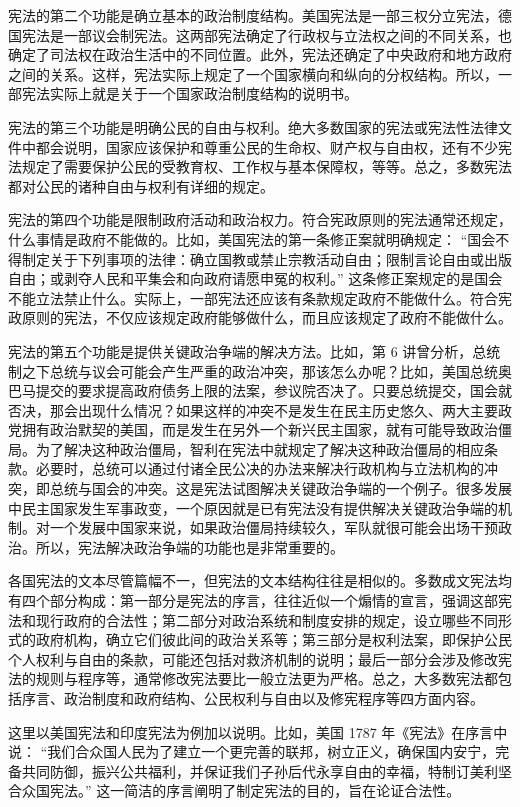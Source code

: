 宪法的第二个功能是确立基本的政治制度结构。美国宪法是一部三权分立宪法，德国宪法是一部议会制宪法。这两部宪法确定了行政权与立法权之间的不同关系，也确定了司法权在政治生活中的不同位置。此外，宪法还确定了中央政府和地方政府之间的关系。这样，宪法实际上规定了一个国家横向和纵向的分权结构。所以，一部宪法实际上就是关于一个国家政治制度结构的说明书。

宪法的第三个功能是明确公民的自由与权利。绝大多数国家的宪法或宪法性法律文件中都会说明，国家应该保护和尊重公民的生命权、财产权与自由权，还有不少宪法规定了需要保护公民的受教育权、工作权与基本保障权，等等。总之，多数宪法都对公民的诸种自由与权利有详细的规定。

宪法的第四个功能是限制政府活动和政治权力。符合宪政原则的宪法通常还规定，什么事情是政府不能做的。比如，美国宪法的第一条修正案就明确规定： “国会不得制定关于下列事项的法律：确立国教或禁止宗教活动自由；限制言论自由或出版自由；或剥夺人民和平集会和向政府请愿申冤的权利。” 这条修正案规定的是国会不能立法禁止什么。实际上，一部宪法还应该有条款规定政府不能做什么。符合宪政原则的宪法，不仅应该规定政府能够做什么，而且应该规定了政府不能做什么。

宪法的第五个功能是提供关键政治争端的解决方法。比如，第 6 讲曾分析，总统制之下总统与议会可能会产生严重的政治冲突，那该怎么办呢？比如，美国总统奥巴马提交的要求提高政府债务上限的法案，参议院否决了。只要总统提交，国会就否决，那会出现什么情况？如果这样的冲突不是发生在民主历史悠久、两大主要政党拥有政治默契的美国，而是发生在另外一个新兴民主国家，就有可能导致政治僵局。为了解决这种政治僵局，智利在宪法中就规定了解决这种政治僵局的相应条款。必要时，总统可以通过付诸全民公决的办法来解决行政机构与立法机构的冲突，即总统与国会的冲突。这是宪法试图解决关键政治争端的一个例子。很多发展中民主国家发生军事政变，一个原因就是已有宪法没有提供解决关键政治争端的机制。对一个发展中国家来说，如果政治僵局持续较久，军队就很可能会出场干预政治。所以，宪法解决政治争端的功能也是非常重要的。

各国宪法的文本尽管篇幅不一，但宪法的文本结构往往是相似的。多数成文宪法均有四个部分构成：第一部分是宪法的序言，往往近似一个煽情的宣言，强调这部宪法和现行政府的合法性；第二部分对政治系统和制度安排的规定，设立哪些不同形式的政府机构，确立它们彼此间的政治关系等；第三部分是权利法案，即保护公民个人权利与自由的条款，可能还包括对救济机制的说明；最后一部分会涉及修改宪法的规则与程序等，通常修改宪法要比一般立法更为严格。总之，大多数宪法都包括序言、政治制度和政府结构、公民权利与自由以及修宪程序等四方面内容。

这里以美国宪法和印度宪法为例加以说明。比如，美国 1787 年《宪法》在序言中说： “我们合众国人民为了建立一个更完善的联邦，树立正义，确保国内安宁，完备共同防御，振兴公共福利，并保证我们子孙后代永享自由的幸福，特制订美利坚合众国宪法。” 这一简洁的序言阐明了制定宪法的目的，旨在论证合法性。

